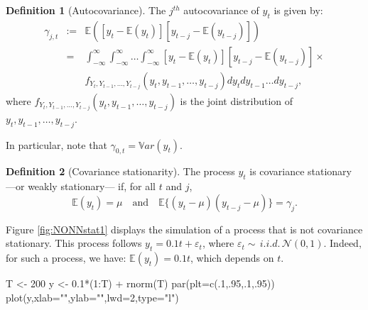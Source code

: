 \documentclass[
  12pt,
]{book}
\newenvironment{Shaded}{\begin{snugshade}}{\end{snugshade}}
\newcommand{\AttributeTok}[1]{\textcolor[rgb]{0.77,0.63,0.00}{#1}}
\newcommand{\DecValTok}[1]{\textcolor[rgb]{0.00,0.00,0.81}{#1}}
\newcommand{\FloatTok}[1]{\textcolor[rgb]{0.00,0.00,0.81}{#1}}
\newcommand{\FunctionTok}[1]{\textcolor[rgb]{0.00,0.00,0.00}{#1}}
\newcommand{\NormalTok}[1]{#1}
\newcommand{\OtherTok}[1]{\textcolor[rgb]{0.56,0.35,0.01}{#1}}
\newcommand{\SpecialCharTok}[1]{\textcolor[rgb]{0.00,0.00,0.00}{#1}}
\newcommand{\StringTok}[1]{\textcolor[rgb]{0.31,0.60,0.02}{#1}}
\theoremstyle{definition}
\newtheorem{definition}{Definition}[chapter]
\theoremstyle{definition}
\theoremstyle{definition}
\theoremstyle{definition}
\theoremstyle{remark}
\begin{document}
\begin{definition}[Autocovariance]
\protect\hypertarget{def:autocov}{}\label{def:autocov}The \(j^{th}\) autocovariance of \(y_t\) is given by:
\begin{eqnarray*}
\gamma_{j,t} &:=& \mathbb{E}([y_t - \mathbb{E}(y_t)][y_{t-j} - \mathbb{E}(y_{t-j})])\\
&=& \int_{-\infty}^{\infty} \int_{-\infty}^{\infty} \dots \int_{-\infty}^{\infty} [y_t - \mathbb{E}(y_t)][y_{t-j} - \mathbb{E}(y_{t-j})] \times\\
&& f_{Y_t,Y_{t-1},\dots,Y_{t-j}}(y_t,y_{t-1},\dots,y_{t-j}) dy_t dy_{t-1} \dots dy_{t-j},
\end{eqnarray*}
where \(f_{Y_t,Y_{t-1},\dots,Y_{t-j}}(y_t,y_{t-1},\dots,y_{t-j})\) is the joint distribution of \(y_t,y_{t-1},\dots,y_{t-j}\).
\end{definition}

In particular, note that \(\gamma_{0,t} = \mathbb{V}ar(y_t)\).

\begin{definition}[Covariance stationarity]
\protect\hypertarget{def:covstat}{}\label{def:covstat}The process \(y_t\) is covariance stationary ---or weakly stationary--- if, for all \(t\) and \(j\),
\[
\mathbb{E}(y_t) = \mu \quad \mbox{and} \quad \mathbb{E}\{(y_t - \mu)(y_{t-j} - \mu)\} = \gamma_j.
\]
\end{definition}

Figure \ref{fig:NONNstat1} displays the simulation of a process that is not covariance stationary. This process follows \(y_t = 0.1t + \varepsilon_t\), where \(\varepsilon_t \sim\,i.i.d.\,\mathcal{N}(0,1)\). Indeed, for such a process, we have: \(\mathbb{E}(y_t)=0.1t\), which depends on \(t\).

\begin{Shaded}
\begin{Highlighting}[]
\NormalTok{T }\OtherTok{\textless{}{-}} \DecValTok{200}
\NormalTok{y }\OtherTok{\textless{}{-}} \FloatTok{0.1}\SpecialCharTok{*}\NormalTok{(}\DecValTok{1}\SpecialCharTok{:}\NormalTok{T) }\SpecialCharTok{+} \FunctionTok{rnorm}\NormalTok{(T)}
\FunctionTok{par}\NormalTok{(}\AttributeTok{plt=}\FunctionTok{c}\NormalTok{(.}\DecValTok{1}\NormalTok{,.}\DecValTok{95}\NormalTok{,.}\DecValTok{1}\NormalTok{,.}\DecValTok{95}\NormalTok{))}
\FunctionTok{plot}\NormalTok{(y,}\AttributeTok{xlab=}\StringTok{""}\NormalTok{,}\AttributeTok{ylab=}\StringTok{""}\NormalTok{,}\AttributeTok{lwd=}\DecValTok{2}\NormalTok{,}\AttributeTok{type=}\StringTok{"l"}\NormalTok{)}
\end{Highlighting}
\end{Shaded}
\end{document}
